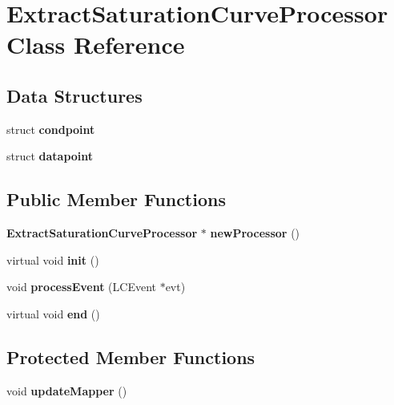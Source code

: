 \section{ExtractSaturationCurveProcessor Class Reference}
\label{classExtractSaturationCurveProcessor}
\subsection*{Data Structures}
\begin{DoxyCompactItemize}
\item 
struct {\bf condpoint}
\item 
struct {\bf datapoint}
\end{DoxyCompactItemize}
\subsection*{Public Member Functions}
\begin{DoxyCompactItemize}
\item 
{\bf ExtractSaturationCurveProcessor} $\ast$ {\bfseries newProcessor} ()\label{classExtractSaturationCurveProcessor_ac1cb6cef4f5a0a82ab72e103082a580d}

\item 
virtual void {\bfseries init} ()\label{classExtractSaturationCurveProcessor_a7feca5d6491897eb4a0642745c568049}

\item 
void {\bfseries processEvent} (LCEvent $\ast$evt)\label{classExtractSaturationCurveProcessor_a54c0e4af7a3c2c35c367035faedaf50c}

\item 
virtual void {\bfseries end} ()\label{classExtractSaturationCurveProcessor_aedeae6bf28cea73d8dbfb07307e8caa3}

\end{DoxyCompactItemize}
\subsection*{Protected Member Functions}
\begin{DoxyCompactItemize}
\item 
void {\bfseries updateMapper} ()\label{classExtractSaturationCurveProcessor_aae75a6b00dd5dc100b72aa560c1ee56c}

\end{DoxyCompactItemize}
